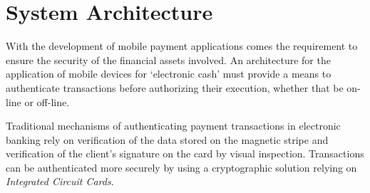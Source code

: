 \section{System Architecture}
\label{sec:hardware_architecture}
With the development of mobile payment applications comes the requirement to ensure the security of the financial assets involved.
An architecture for the application of mobile devices for `electronic cash' must provide a means to authenticate transactions before authorizing their execution, whether that be on-line or off-line.


Traditional mechanisms of authenticating payment transactions in electronic banking rely on verification of the data stored on the magnetic stripe and verification of the client's signature on the card by visual inspection.
Transactions can be authenticated more securely by using a cryptographic solution relying on \textit{Integrated Circuit Cards}.

